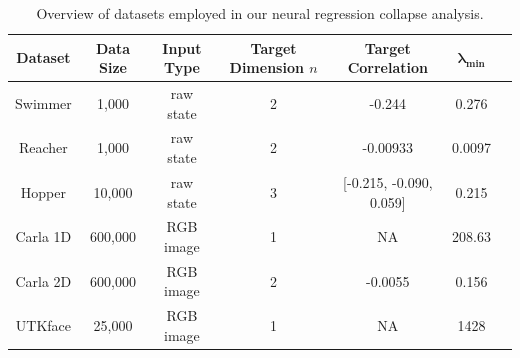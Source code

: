 \begin{table}[h!]

\label{table:datasets}
\caption{Overview of datasets employed in our neural regression collapse analysis.}
\begin{center}
\begin{small}
\begin{tabular}{ccccccc}
\toprule
\textbf{Dataset} & \textbf{Data Size} & \textbf{Input Type} & \textbf{Target Dimension} $n$ & \textbf{Target Correlation} & $\mathbf{\lambda_{min}}$\\
\midrule
Swimmer & 1,000 & raw state & 2 & -0.244 & 0.276\\

Reacher & 1,000 & raw state & 2 & -0.00933 & 0.0097\\

Hopper & 10,000 & raw state & 3  & [-0.215, -0.090, 0.059]  & 0.215\\
\midrule
Carla 1D & 600,000 & RGB image & 1 & NA & 208.63\\
\midrule
Carla 2D & 600,000 & RGB image & 2 & -0.0055 & 0.156\\
\midrule
UTKface & 25,000 & RGB image & 1 & NA & 1428\\

    
\bottomrule
\end{tabular}
\end{small}
\end{center}
\label{tab:data}
\end{table} 

